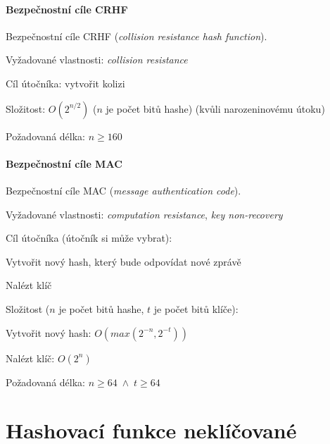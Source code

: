 \paragraph*{Bezpečnostní cíle CRHF} Bezpečnostní cíle CRHF (\textit{collision resistance hash function}). \begin{compactitem}
    \item Vyžadované vlastnosti: \textit{collision resistance}
    \item Cíl útočníka: vytvořit kolizi
    \item Složitost: $O(2^{n / 2})$ ($n$ je počet bitů hashe) (kvůli narozeninovému útoku)
    \item Požadovaná délka: $n \geq 160$
\end{compactitem}

\paragraph*{Bezpečnostní cíle MAC} Bezpečnostní cíle MAC (\textit{message authentication code}). \begin{compactitem}
    \item Vyžadované vlastnosti: \textit{computation resistance}, \textit{key non-recovery}
    \item Cíl útočníka (útočník si může vybrat): \begin{compactitem}
        \item Vytvořit nový hash, který bude odpovídat nové zprávě
        \item Nalézt klíč
    \end{compactitem}
    \item Složitost ($n$ je počet bitů hashe, $t$ je počet bitů klíče): \begin{compactitem}
        \item Vytvořit nový hash: $O(max(2^{-n}, 2^{-t}))$
        \item Nalézt klíč: $O(2^n)$
    \end{compactitem}
    \item Požadovaná délka: $n \geq 64 \; \land \; t \geq 64$
\end{compactitem}


\section{Hashovací funkce neklíčované}

